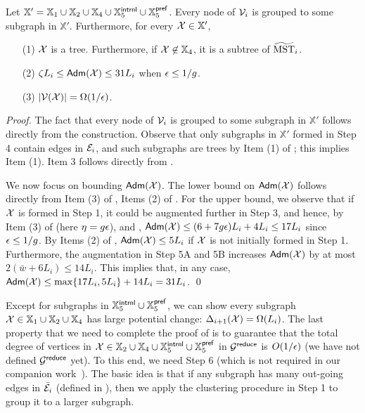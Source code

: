 \begin{lemma}\label{lm:Adm-Xprime}Let $\mathbb{X}' = \mathbb{X}_1 \cup \mathbb{X}_2\cup \mathbb{X}_4 \cup \mathbb{X}_5^{\mathsf{intrnl}} \cup \mathbb{X}_5^{\mathsf{pref}}$. Every node of $\mathcal{V}_i$ is grouped to some subgraph in $\mathbb{X}'$. Furthermore, for every $\mathcal{X} \in \mathbb{X}'$,
		\begin{enumerate}[noitemsep]
		\item[(1)] $\mathcal{X}$ is a tree. Furthermore, if $\mathcal{X} \not\in \mathbb{X}_4$, it is a subtree of $\widetilde{\mathrm{MST}}_{i}$. 
		\item[(2)]  $\zeta L_i \leq \mathsf{Adm}(\mathcal{X}) \leq 31 L_i$ when $\epsilon \leq 1/g$.
		\item[(3)] $|\mathcal{V}(\mathcal{X})| = \Omega(1/\epsilon)$.
	\end{enumerate}
\end{lemma}
\begin{proof}
 The fact that  every node of $\mathcal{V}_i$ is grouped to some subgraph in $\mathbb{X}'$ follows directly from the construction. Observe that only subgraphs  in $\mathbb{X}'$ formed in Step 4 contain edges in $\mathcal{E}_i$, and such subgraphs are trees by Item (1)  of ;  this implies Item (1). Item 3 follows directly from . 
 
 We now focus on bounding $\mathsf{Adm}(\mathcal{X})$. The lower bound on $\mathsf{Adm}(\mathcal{X})$ follows directly from Item (3) of , Items (2) of . For the upper bound, we observe that if $\mathcal{X}$ is formed in Step 1, it could be augmented further in Step 3, and hence, by Item (3) of  (here $\eta = g\epsilon$), and , $\mathsf{Adm}(\mathcal{X}) \leq (6 + 7g\epsilon)L_i + 4L_i \leq 17L_i$ since $\epsilon \leq 1/g$. By Items (2) of , $\mathsf{Adm}(\mathcal{X}) \leq 5L_i$ if $\mathcal{X}$ is not initially formed in Step 1. Furthermore,  the augmentation in Step 5A and 5B increases $\mathsf{Adm}(\mathcal{X})$ by at most $2(\bar{w} + 6L_i)\leq 14L_i$. This implies that, in any case, $\mathsf{Adm}(\mathcal{X})\leq \max\{17L_i, 5L_i\} + 14L_i = 31L_i$. \qed
\end{proof}


Except for subgraphs in $\mathbb{X}_5^{\mathsf{intrnl}} \cup \mathbb{X}_5^{\mathsf{pref}}$, we can show every subgraph $\mathcal{X} \in \mathbb{X}_1 \cup \mathbb{X}_2\cup \mathbb{X}_4$ has large potential change: $\Delta_{i+1}(\mathcal{X}) = \Omega(L_i)$. The last property that we need to complete the proof of  is to guarantee that the total degree of vertices in  $\mathcal{X} \in  \mathbb{X}_2\cup \mathbb{X}_4\cup \mathbb{X}_5^{\mathsf{intrnl}} \cup \mathbb{X}_5^{\mathsf{pref}}$ in $\mathcal{G}^{\mathsf{reduce}}$ is $O(1/\epsilon)$ (we have not defined $\mathcal{G}^{\mathsf{reduce}}$ yet). To this end, we need Step 6 (which is not required in our companion work~\cite{LS21}). The basic idea is that if any subgraph has many out-going edges in $\bar{\mathcal{E}}_i$ (defined in ), then we apply the clustering procedure in Step 1 to group it to a larger subgraph. 




